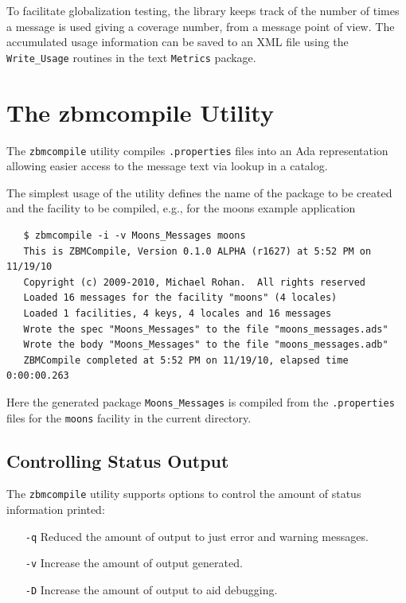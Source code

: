 To facilitate globalization testing, the library keeps track of the number
of times a message is used giving a coverage number, from a message point
of view.  The accumulated usage information can be saved to an XML file
using the \verb|Write_Usage| routines in the text \verb|Metrics| package.

\section{The zbmcompile Utility}
\label{sec:zbmcompile}

The \verb|zbmcompile| utility compiles \texttt{.properties} files into
an Ada representation allowing easier access to the message text via
lookup in a catalog.

The simplest usage of the utility defines the name of the package to be
created and the facility to be compiled, e.g., for the moons example
application
\begin{xmpl}
\begin{verbatim}
   $ zbmcompile -i -v Moons_Messages moons
   This is ZBMCompile, Version 0.1.0 ALPHA (r1627) at 5:52 PM on 11/19/10
   Copyright (c) 2009-2010, Michael Rohan.  All rights reserved
   Loaded 16 messages for the facility "moons" (4 locales)
   Loaded 1 facilities, 4 keys, 4 locales and 16 messages
   Wrote the spec "Moons_Messages" to the file "moons_messages.ads"
   Wrote the body "Moons_Messages" to the file "moons_messages.adb"
   ZBMCompile completed at 5:52 PM on 11/19/10, elapsed time 0:00:00.263
\end{verbatim}
\end{xmpl}
Here the generated package \verb|Moons_Messages| is compiled from the
\texttt{.properties} files for the \verb|moons| facility in the current
directory.

\subsection{Controlling Status Output}

The \verb|zbmcompile| utility supports options to control the amount
of status information printed:
\begin{itemize}
\item[\texttt{-q}] Reduced the amount of output to just error and warning
                   messages.
\item[\texttt{-v}] Increase the amount of output generated.
\item[\texttt{-D}] Increase the amount of output to aid debugging.
\end{itemize}

